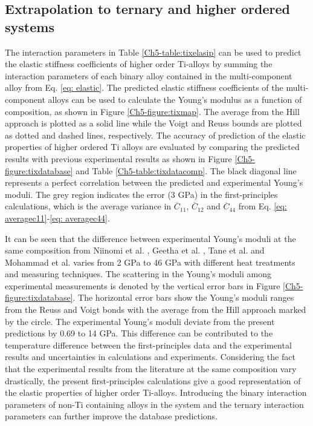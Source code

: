 \subsection{Extrapolation to ternary and higher ordered systems}

The interaction parameters in Table \ref{Ch5-table:tixelasip} can be used to predict the elastic stiffness coefficients of higher order Ti-alloys by summing the interaction parameters of each binary alloy contained in the multi-component alloy from Eq. \ref{eq: elastic}. The predicted elastic stiffness coefficients of the multi-component alloys can be used to calculate the Young's modulus as a function of composition, as shown in Figure \ref{Ch5-figure:tixmap}. The average from the Hill approach is plotted as a solid line while the Voigt and Reuss bounds are plotted as dotted and dashed lines, respectively. The accuracy of prediction of the elastic properties of higher ordered Ti alloys are evaluated by comparing the predicted results with previous experimental results \cite{Niinomi2012,Tane2010a,Geetha2009,Mohammed2014} as shown in Figure \ref{Ch5-figure:tixdatabase} and Table \ref{Ch5-table:tixdatacomp}. The black diagonal line represents a perfect correlation between the predicted and experimental Young's moduli. The grey region indicates the error (3 GPa) in the first-principles calculations, which is the average variance in $\overline{C}_{11}$, $\overline{C}_{12}$ and $\overline{C}_{44}$ from Eq. \ref{eq: averagec11}-\ref{eq: averagec44}. 

It can be seen that the difference between experimental Young's moduli at the same composition from Niinomi et al. \cite{Niinomi2012}, Geetha et al. \cite{Geetha2009}, Tane et al. \cite{Tane2010a} and Mohammad et al. \cite{Mohammed2014} varies from 2 GPa to 46 GPa with different heat treatments and measuring techniques. The scattering in the Young's moduli among experimental measurements is denoted by the vertical error bars in Figure \ref{Ch5-figure:tixdatabase}. The horizontal error bars show the Young's moduli ranges from the Reuss and Voigt bonds with the average from the Hill approach marked by the circle. The experimental Young's moduli deviate from the present predictions by 0.69 to 14 GPa. This difference can be contributed to the temperature difference between the first-principles data and the experimental results and uncertainties in calculations and experiments. Considering the fact that the experimental results from the literature at the same composition vary drastically, the present first-principles calculations give a good representation of the elastic properties of higher order Ti-alloys. Introducing the binary interaction parameters of non-Ti containing alloys in the system and the ternary interaction parameters can further improve the database predictions. 


